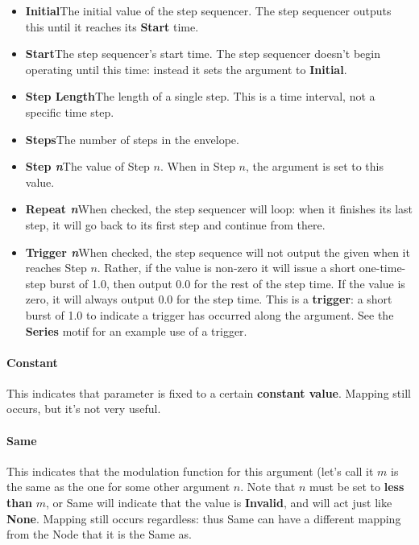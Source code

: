 \documentclass[twoside,10pt]{article}
\begin{document}
\begin{itemize}
\item {\bf Initial}\qquad The initial value of the step sequencer.   The step sequencer outputs this until it reaches its {\bf Start} time.
\item {\bf Start}\qquad The step sequencer's start time.  The step sequencer doesn't begin operating until this time: instead it sets the argument to {\bf Initial}.
\item {\bf Step Length}\qquad The length of a single step.  This is a time interval, not a specific time step.
\item {\bf Steps}\qquad The number of steps in the envelope.
\item {\bf Step \textit{n}}\qquad The value of Step \(n\).  When in Step \(n\), the argument is set to this value.
\item {\bf Repeat \textit{n}}\qquad When checked, the step sequencer will loop: when it finishes its last step, it will go back to its first step and continue from there.
\item {\bf Trigger \textit{n}}\qquad When checked, the step sequence will not output the given when it reaches Step \(n\).  Rather, if the value is non-zero it will issue a short one-time-step burst of 1.0, then output 0.0 for the rest of the step time.  If the value is zero, it will always output 0.0 for the step time.  This is a {\bf trigger}: a short burst of 1.0 to indicate a trigger has occurred along the argument.  See the {\bf Series} motif for an example use of a trigger.
\end{itemize}

\paragraph{Constant}

This indicates that parameter is fixed to a certain {\bf constant value}.  Mapping still occurs, but it's not very useful.

\paragraph{Same}

This indicates that the modulation function for this argument (let's call it \(m\) is the same as the one for some other argument \(n\). Note that \(n\) must be set to {\bf less than} \(m\), or Same will indicate that the value is {\bf Invalid}, and will act just like {\bf None}.  Mapping still occurs regardless: thus Same can have a different mapping from the Node that it is the Same as.
\end{document}
